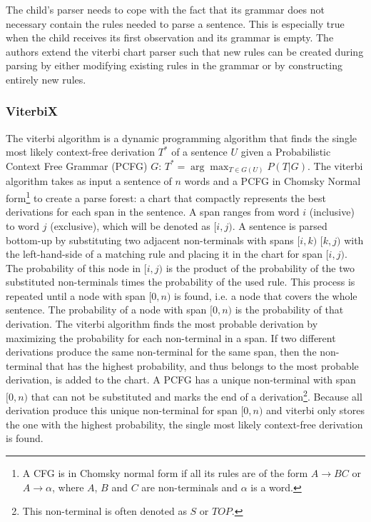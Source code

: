 \documentclass[a4paper]{article}
\begin{document}
The child's parser needs to cope with the fact that its grammar does not necessary contain the rules needed to parse a sentence. This is especially true when the child receives its first observation and its grammar is empty. The authors extend the viterbi chart parser such that new rules can be created during parsing by either modifying existing rules in the grammar or by constructing entirely new rules. 

\subsubsection{ViterbiX} %
The viterbi algorithm is a dynamic programming algorithm that finds the single most likely context-free derivation $T^*$ of a sentence $U$ given a Probabilistic Context Free Grammar (PCFG) $G$: $T^* = \arg \max_{T \in G(U)} P(T|G)$. The viterbi algorithm takes as input a sentence of $n$ words and a PCFG in Chomsky Normal form\footnote{A CFG is in Chomsky normal form if all its rules are of the form $A \rightarrow BC$ or $A \rightarrow \alpha$, where $A$, $B$ and $C$ are non-terminals and $\alpha$ is a word.} to create a parse forest: a chart that compactly represents the best derivations for each span in the sentence. A span ranges from word $i$ (inclusive) to word $j$ (exclusive), which will be denoted as $[i,j)$. A sentence is parsed bottom-up by substituting two adjacent non-terminals with spans $[i,k)$ $[k,j)$ with the left-hand-side of a matching rule and placing it in the chart for span $[i,j)$. The probability of this node in $[i,j)$ is the product of the probability of the two substituted non-terminals times the probability of the used rule. This process is repeated until a node with span $[0,n)$ is found, i.e. a node that covers the whole sentence. The probability of a node with span $[0,n)$ is the probability of that derivation. The viterbi algorithm finds the most probable derivation by maximizing the probability for each non-terminal in a span. If two different derivations produce the same non-terminal for the same span, then the non-terminal that has the highest probability, and thus belongs to the most probable derivation, is added to the chart. A PCFG has a unique non-terminal with span $[0,n)$ that can not be substituted and marks the end of a derivation\footnote{This non-terminal is often denoted as $S$ or $TOP$.}. Because all derivation produce this unique non-terminal for span $[0,n)$ and viterbi only stores the one with the highest probability, the single most likely context-free derivation is found. 
\end{document}

